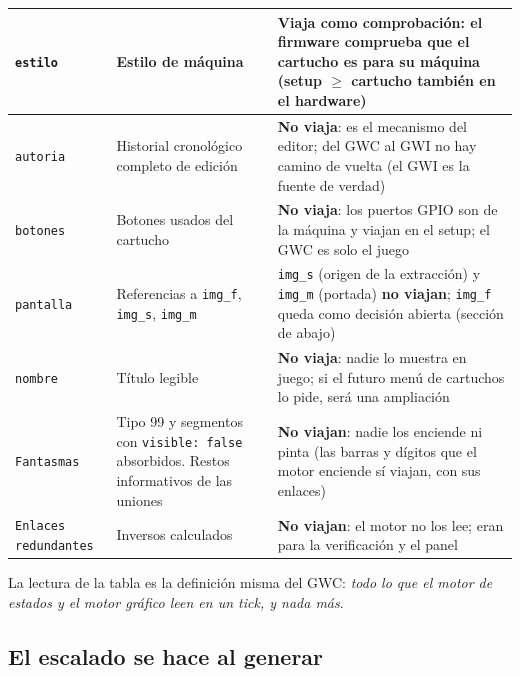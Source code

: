 \begin{small}
\begin{xltabular}{\textwidth}{@{}l Y Y@{}}
		\texttt{estilo} & Estilo de máquina & \textbf{Viaja como comprobación}: el firmware comprueba que el cartucho es para su máquina (setup $\geq$ cartucho también en el hardware) \\ \hline
		
		\texttt{autoria} & Historial cronológico completo de edición & \textbf{No viaja}: es el mecanismo del editor; del GWC al GWI no hay camino de vuelta (el GWI es la fuente de verdad) \\ \hline
		
		\texttt{botones} & Botones usados del cartucho & \textbf{No viaja}: los puertos GPIO son de la máquina y viajan en el setup; el GWC es solo el juego \\ \hline
		
		\texttt{pantalla} & Referencias a \texttt{img\_f}, \texttt{img\_s}, \texttt{img\_m} & \texttt{img\_s} (origen de la extracción) y \texttt{img\_m} (portada) \textbf{no viajan}; \texttt{img\_f} queda como decisión abierta (sección de abajo) \\ \hline
		
		\texttt{nombre} & Título legible & \textbf{No viaja}: nadie lo muestra en juego; si el futuro menú de cartuchos lo pide, será una ampliación \\ \hline
		
		\texttt{Fantasmas} & Tipo 99 y segmentos con \texttt{visible: false} absorbidos. Restos informativos de las uniones & \textbf{No viajan}: nadie los enciende ni pinta (las barras y dígitos que el motor enciende sí viajan, con sus enlaces) \\ \hline
		
		\texttt{Enlaces redundantes} & Inversos calculados & \textbf{No viajan}: el motor no los lee; eran para la verificación y el panel \\ \hline
		
	\end{xltabular}

\nopagebreak
{}
\label{tab:CamposGWIaGWC}
\end{small}

La lectura de la tabla es la definición misma del GWC: \emph{todo lo que el motor de estados 
y el motor gráfico leen en un tick, y nada más}.

\subsection{El escalado se hace al generar}
\label{sec:F5Escala}

